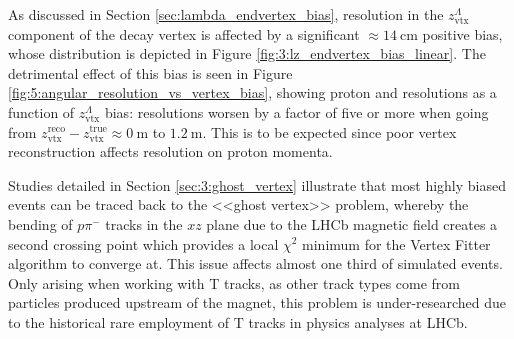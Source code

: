 As discussed in Section \ref{sec:lambda_endvertex_bias}, resolution in the $z_\text{vtx}^\Lambda$ component of the \lambdadecay decay vertex is affected by a significant $\approx \SI{14}{\centi\meter}$ positive bias, whose distribution is depicted in Figure \ref{fig:3:lz_endvertex_bias_linear}.
The detrimental effect of this bias is seen in Figure \ref{fig:5:angular_resolution_vs_vertex_bias}, showing proton \cthetap and \phip resolutions as a function of $z_\text{vtx}^\Lambda$ bias:
resolutions worsen by a factor of five or more when going from $z_\text{vtx}^\text{reco} - z_\text{vtx}^\text{true} \approx \SI{0}{\meter}$ to $\SI{1.2}{\meter}$.
This is to be expected since poor \lz vertex reconstruction affects resolution on proton momenta.


Studies detailed in Section \ref{sec:3:ghost_vertex} illustrate that most highly biased events can be traced back to the <<ghost vertex>> problem, whereby the bending of $p\pi^-$ tracks in the $xz$ plane due to the LHCb magnetic field creates a second crossing point which provides a local $\chi^2$ minimum for the Vertex Fitter algorithm to converge at.
This issue affects almost one third of \demonstratorshort simulated events.
Only arising when working with T tracks, as other track types come from particles produced upstream of the magnet, this problem is under-researched due to the historical rare employment of T tracks in physics analyses at LHCb.

